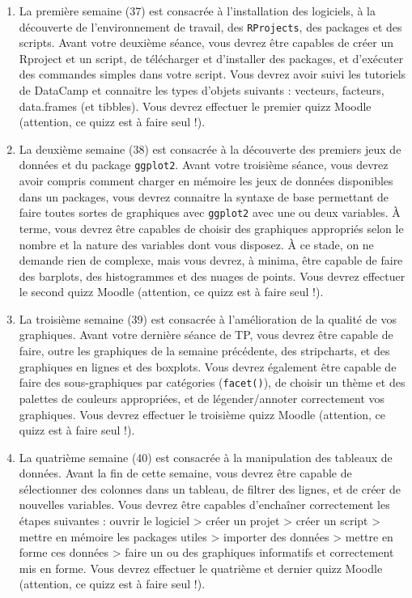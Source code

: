 \documentclass[
  letterpaper,
  DIV=11,
  numbers=noendperiod]{scrreprt}
\begin{document}
\begin{enumerate}
\def\labelenumi{\arabic{enumi}.}
\item
  La première semaine (37) est consacrée à l'installation des logiciels,
  à la découverte de l'environnement de travail, des \texttt{RProjects},
  des packages et des scripts. Avant votre deuxième séance, vous devrez
  être capables de créer un Rproject et un script, de télécharger et
  d'installer des packages, et d'exécuter des commandes simples dans
  votre script. Vous devrez avoir suivi les tutoriels de DataCamp et
  connaitre les types d'objets suivants : vecteurs, facteurs,
  data.frames (et tibbles). Vous devrez effectuer le premier quizz
  Moodle (attention, ce quizz est à faire seul !).
\item
  La deuxième semaine (38) est consacrée à la découverte des premiers
  jeux de données et du package \texttt{ggplot2}. Avant votre troisième
  séance, vous devrez avoir compris comment charger en mémoire les jeux
  de données disponibles dans un packages, vous devrez connaitre la
  syntaxe de base permettant de faire toutes sortes de graphiques avec
  \texttt{ggplot2} avec une ou deux variables. À terme, vous devrez être
  capables de choisir des graphiques appropriés selon le nombre et la
  nature des variables dont vous disposez. À ce stade, on ne demande
  rien de complexe, mais vous devrez, à minima, être capable de faire
  des barplots, des histogrammes et des nuages de points. Vous devrez
  effectuer le second quizz Moodle (attention, ce quizz est à faire seul
  !).
\item
  La troisième semaine (39) est consacrée à l'amélioration de la qualité
  de vos graphiques. Avant votre dernière séance de TP, vous devrez être
  capable de faire, outre les graphiques de la semaine précédente, des
  stripcharts, et des graphiques en lignes et des boxplots. Vous devrez
  également être capable de faire des sous-graphiques par catégories
  (\texttt{facet()}), de choisir un thème et des palettes de couleurs
  appropriées, et de légender/annoter correctement vos graphiques. Vous
  devrez effectuer le troisième quizz Moodle (attention, ce quizz est à
  faire seul !).
\item
  La quatrième semaine (40) est consacrée à la manipulation des tableaux
  de données. Avant la fin de cette semaine, vous devrez être capable de
  sélectionner des colonnes dans un tableau, de filtrer des lignes, et
  de créer de nouvelles variables. Vous devrez être capables d'enchaîner
  correctement les étapes suivantes : ouvrir le logiciel \textgreater{}
  créer un projet \textgreater{} créer un script \textgreater{} mettre
  en mémoire les packages utiles \textgreater{} importer des données
  \textgreater{} mettre en forme ces données \textgreater{} faire un ou
  des graphiques informatifs et correctement mis en forme. Vous devrez
  effectuer le quatrième et dernier quizz Moodle (attention, ce quizz
  est à faire seul !).
\end{enumerate}
\end{document}
